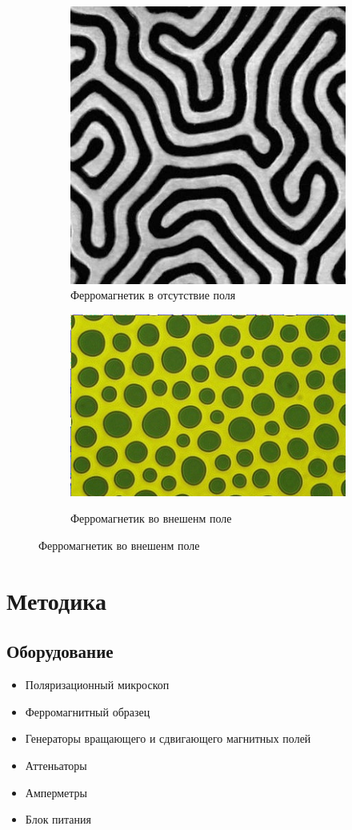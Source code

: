 \documentclass[a4paper, 14pt]{extarticle}
\begin{document}
\begin{figure}[htbp]
    \centering
    \begin{subfigure}{0.4\textwidth}
        \centering
        \includegraphics*[width = 0.5\linewidth]{no_field.jpg}
        \caption{Ферромагнетик в отсутствие поля}
        \label{fig:no_field}
    \end{subfigure}%
    \begin{subfigure}{0.4\textwidth}
        \centering  
        \includegraphics*[width = 0.5\linewidth]{field.png}
        \label{fig:field}
        \caption{Ферромагнетик во внешенм поле}
    \end{subfigure}
\end{figure}



\section*{\textcolor{header}{Методика}}
\subsection*{\textcolor{sub_header}{Оборудование}}

\begin{itemize}
    \item Поляризационный микроскоп
    \item Ферромагнитный образец
    \item Генераторы вращающего и сдвигающего магнитных полей
    \item Аттеньаторы
    \item Амперметры
    \item Блок питания
\end{itemize}
\end{document}
